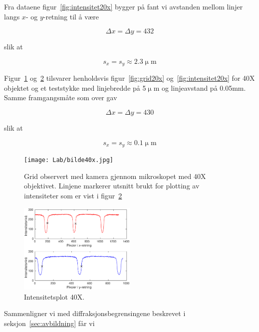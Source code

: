 \documentclass[a4paper,11pt, twocolumn]{article}
\begin{document}
Fra dataene figur~\ref{fig:intensitet20x} bygger på fant vi avstanden mellom linjer langs $x$- og $y$-retning til å være

\begin{equation}
	\Delta x = \Delta y = 432
	\label{eq:dxdy20x}
\end{equation}

slik at

\begin{equation}
	s_x=s_y \approx 2.3\upmu\text{m}
	\label{eq:sxsy20x}
\end{equation}

Figur~\ref{fig:grid40x} og~\ref{fig:intensitet40x} tilsvarer henholdsvis figur~\ref{fig:grid20x} og~\ref{fig:intensitet20x} for 40X objektet og et teststykke med linjebredde på 5$\upmu$m og linjeavstand på 0.05mm. Samme framgangsmåte som over gav 

\begin{equation}
	\Delta x=\Delta y=430
	\label{dxdy40x}
\end{equation}

slik at

\begin{equation}
	s_x = s_y \approx 0.1\upmu\text{m}
	\label{eq:sxsy40x}
\end{equation}

\begin{figure}[!ht]
	\centering
	\texttt{[image: Lab/bilde40x.jpg]}
	\caption{Grid observert med kamera gjennom mikroskopet med 40X objektivet. Linjene markerer utsnitt brukt for plotting av intensiteter som er vist i figur~\ref{fig:intensitet40x}}
	\label{fig:grid40x}
\end{figure}

\begin{figure}[!ht]
	\centering
	\includegraphics[width = 0.5\textwidth]{Lab/gitter40x.eps}
	\caption{Intensitetsplot 40X.}
	\label{fig:intensitet40x}
\end{figure}

Sammenligner vi med diffraksjonsbegrensingene beskrevet i seksjon~\ref{sec:avbildning} får vi
\end{document}
